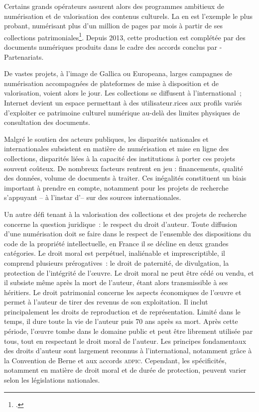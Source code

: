 Certains grands opérateurs assurent alors des programmes ambitieux de
numérisation et de valorisation des contenus culturels. La \bnf en est
l'exemple le plus probant, numérisant plus d'un million de pages par
mois à partir de ses collections patrimoniales\footcite{noauthor_numerisation_nodate}. Depuis
2013, cette production est complétée par des documents numériques
produits dans le cadre des accords conclus par \bnf-Partenariats.

De vastes projets, à l'image de Gallica ou Europeana, larges campagnes
de numérisation accompagnées de plateformes de mise à disposition et de
valorisation, voient alors le jour. Les collections se diffusent à
l'international~; Internet devient un espace permettant à des
utilisateur.rices aux profils variés d'exploiter ce patrimoine culturel
numérique au-delà des limites physiques de consultation des documents.

Malgré le soutien des acteurs publiques, les disparités nationales et
internationales subsistent en matière de numérisation et mise en ligne
des collections, disparités liées à la capacité des institutions à
porter ces projets souvent coûteux. De nombreux facteurs rentrent en jeu
: financements, qualité des données, volume de documents à traiter. Ces
inégalités constituent un biais important à prendre en compte, notamment
pour les projets de recherche s'appuyant -- à l'instar d'\eida -- sur des
sources internationales.

Un autre défi tenant à la valorisation des collections et des projets de
recherche concerne la question juridique~: le respect du droit d'auteur.
Toute diffusion d'une numérisation doit se faire dans le respect de
l'ensemble des dispositions du code de la propriété intellectuelle, en
France il se décline en deux grandes catégories. Le droit moral est
perpétuel, inaliénable et imprescriptible, il comprend plusieurs
prérogatives~: le droit de paternité, de divulgation, la protection de
l'intégrité de l'œuvre. Le droit moral ne peut être cédé ou vendu, et il
subsiste même après la mort de l'auteur, étant alors transmissible à ses
héritiers. Le droit patrimonial concerne les aspects économiques de
l'œuvre et permet à l'auteur de tirer des revenus de son exploitation.
Il inclut principalement les droits de reproduction et de
représentation. Limité dans le temps, il dure toute la vie de l'auteur
puis 70 ans après sa mort. Après cette période, l'œuvre tombe dans le
domaine public et peut être librement utilisée par tous, tout en
respectant le droit moral de l'auteur. Les principes fondamentaux des
droits d'auteur sont largement reconnus à l'international, notamment
grâce à la Convention de Berne et aux accords \textsc{adpic}. Cependant, les
spécificités, notamment en matière de droit moral et de durée de
protection, peuvent varier selon les législations nationales.

